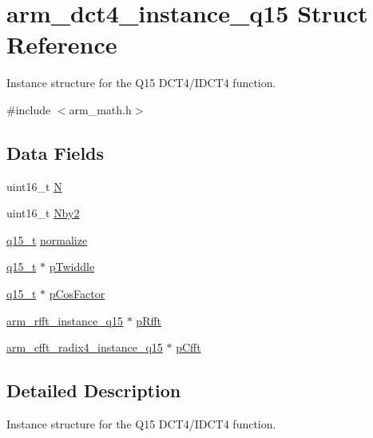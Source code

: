 \hypertarget{structarm__dct4__instance__q15}{}\section{arm\+\_\+dct4\+\_\+instance\+\_\+q15 Struct Reference}
\label{structarm__dct4__instance__q15}


Instance structure for the Q15 D\+C\+T4/\+I\+D\+C\+T4 function.  




{\ttfamily \#include $<$arm\+\_\+math.\+h$>$}

\subsection*{Data Fields}
\begin{DoxyCompactItemize}
\item 
uint16\+\_\+t \hyperlink{structarm__dct4__instance__q15_a37d49571fe35012087153c093705cd11}{N}
\item 
uint16\+\_\+t \hyperlink{structarm__dct4__instance__q15_afa64b1618089e35c2b55cff71cb29715}{Nby2}
\item 
\hyperlink{arm__math_8h_ab5a8fb21a5b3b983d5f54f31614052ea}{q15\+\_\+t} \hyperlink{structarm__dct4__instance__q15_a8ba8c9fa75542dac82553fee982ccd3e}{normalize}
\item 
\hyperlink{arm__math_8h_ab5a8fb21a5b3b983d5f54f31614052ea}{q15\+\_\+t} $\ast$ \hyperlink{structarm__dct4__instance__q15_aa8c837c05b2c910342ab8f171d30dc02}{p\+Twiddle}
\item 
\hyperlink{arm__math_8h_ab5a8fb21a5b3b983d5f54f31614052ea}{q15\+\_\+t} $\ast$ \hyperlink{structarm__dct4__instance__q15_a9d858d313cbba67ceaef9704bc9c43b0}{p\+Cos\+Factor}
\item 
\hyperlink{structarm__rfft__instance__q15}{arm\+\_\+rfft\+\_\+instance\+\_\+q15} $\ast$ \hyperlink{structarm__dct4__instance__q15_aea6aa42c838f2b22c8c31e9e259b8d75}{p\+Rfft}
\item 
\hyperlink{structarm__cfft__radix4__instance__q15}{arm\+\_\+cfft\+\_\+radix4\+\_\+instance\+\_\+q15} $\ast$ \hyperlink{structarm__dct4__instance__q15_ae0ac7c3a89699793fc0dac960db7f056}{p\+Cfft}
\end{DoxyCompactItemize}


\subsection{Detailed Description}
Instance structure for the Q15 D\+C\+T4/\+I\+D\+C\+T4 function. 

